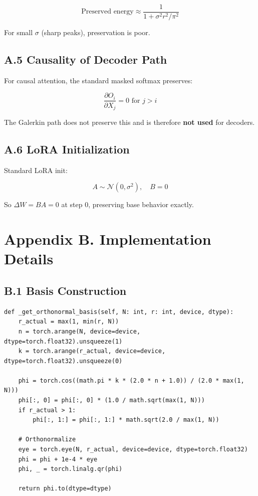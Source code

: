 \[
\text{Preserved energy} \approx \frac{1}{1 + \sigma^2 r^2 / \pi^2}
\]

For small $\sigma$ (sharp peaks), preservation is poor.

\subsection{A.5 Causality of Decoder Path}

For causal attention, the standard masked softmax preserves:

\[
\frac{\partial O_i}{\partial X_j} = 0 \text{ for } j > i
\]

The Galerkin path does not preserve this and is therefore \textbf{not used} for 
decoders.

\subsection{A.6 LoRA Initialization}

Standard LoRA init:

\[
A \sim \mathcal{N}(0, \sigma^2), \quad B = 0
\]

So $\Delta W = BA = 0$ at step 0, preserving base behavior exactly.




\section{Appendix B. Implementation Details}

\subsection{B.1 Basis Construction}

\begin{lstlisting}
def _get_orthonormal_basis(self, N: int, r: int, device, dtype):
    r_actual = max(1, min(r, N))
    n = torch.arange(N, device=device, dtype=torch.float32).unsqueeze(1)
    k = torch.arange(r_actual, device=device, dtype=torch.float32).unsqueeze(0)
    
    phi = torch.cos((math.pi * k * (2.0 * n + 1.0)) / (2.0 * max(1, N)))
    phi[:, 0] = phi[:, 0] * (1.0 / math.sqrt(max(1, N)))
    if r_actual > 1:
        phi[:, 1:] = phi[:, 1:] * math.sqrt(2.0 / max(1, N))
    
    # Orthonormalize
    eye = torch.eye(N, r_actual, device=device, dtype=torch.float32)
    phi = phi + 1e-4 * eye
    phi, _ = torch.linalg.qr(phi)
    
    return phi.to(dtype=dtype)
\end{lstlisting}

